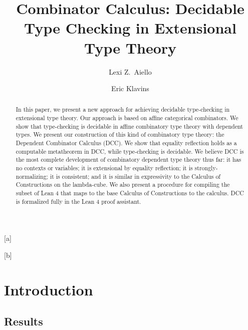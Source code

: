 \documentclass{lmcs}
\begin{document}
\title{Combinator Calculus: Decidable Type Checking in Extensional Type Theory}
\author[L.~Aiello]{Lexi Z.~Aiello}[a]
\author[E.~Klavins]{Eric Klavins}[b]
\address{University of Washington, Department of Philosophy}
\address{University of Washington, Electrical \& Computer Engineering Department}

\begin{abstract}
  In this paper, we present a new approach for achieving decidable type-checking in extensional type theory. Our approach is based on affine categorical combinators. We show that type-checking is decidable in affine combinatory type theory with dependent types. We present our construction of this kind of combinatory type theory: the Dependent Combinator Calculus (DCC). We show that equality reflection holds as a computable metatheorem in DCC, while type-checking is decidable. We believe DCC is the most complete development of combinatory dependent type theory thus far: it has no contexts or variables; it is extensional by equality reflection; it is strongly-normalizing; it is consistent; and it is similar in expressivity to the Calculus of Constructions on the lambda-cube. We also present a procedure for compiling the subset of Lean 4 that maps to the base Calculus of Constructions to the calculus. DCC is formalized fully in the Lean 4 proof assistant.
\end{abstract}

\maketitle

\section*{Introduction}\label{S:one}

\subsection*{Results}
\end{document}
